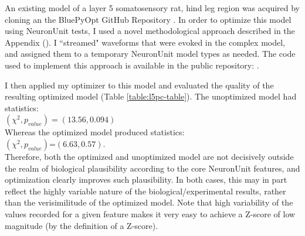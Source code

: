 

An existing model of a layer 5 somatosensory rat, hind leg region was acquired by cloning an the BluePyOpt GitHub Repository \citep{van2016bluepyopt}.
In order to optimize this model using NeuronUnit tests, I used a novel methodological approach described in the Appendix (\label{sec:streaming}). I ``streamed" waveforms that were evoked in the complex model, and assigned them to a temporary  NeuronUnit model types as needed. The code used to implement this approach is available in the public repository: \citep{l5pcnu}. 

I then applied my optimizer to this model and evaluated the quality of the resulting optimized model (Table \ref{table:l5pc-table}).
The unoptimized model had statistics:\\
$(\chi^{2},p_{value})=(13.56, 0.094)$\\
Whereas the optimized model produced statistics:\\
$(\chi^{2},p_{value})$=$(6.63, 0.57)$.\\
Therefore, both the optimized and unoptimized model are not decisively outside the realm of biological plausibility according to the core NeuronUnit features, and optimization clearly improves such plausibility.
In both cases, this may in part reflect the highly variable nature of the biological/experimental results, rather than the verisimilitude of the optimized model.
Note that high variability of the values recorded for a given feature makes it very easy to achieve a Z-score of low magnitude (by the definition of a Z-score).


